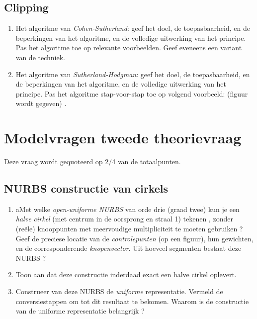 \documentclass{report}
\begin{document}
	\section{Clipping}
	\begin{enumerate}
		\item Het algoritme van \textit{Cohen-Sutherland}: geef het doel, de toepasbaarheid, en de beperkingen van het algoritme, en de volledige uitwerking van het principe. Pas het algoritme toe op relevante voorbeelden. Geef eveneens een variant van de techniek. 
		
		\item Het algoritme van \textit{Sutherland-Hodgman}: geef het doel, de toepasbaarheid, en de beperkingen van het algoritme, en de volledige uitwerking van het principe. Pas het algoritme stap-voor-stap toe op volgend voorbeeld: (figuur wordt gegeven) . 
	\end{enumerate}

	\chapter{Modelvragen tweede theorievraag}
	Deze vraag wordt gequoteerd op 2/4 van de totaalpunten.
	
	\section{NURBS constructie van cirkels }
	\begin{enumerate}
		\item aMet welke \textit{open-uniforme NURBS} van orde drie (graad twee) kun je een \textit{halve cirkel} (met centrum in de oorsprong en straal 1) tekenen , zonder (reële) knooppunten met meervoudige multipliciteit te moeten gebruiken ? Geef de preciese locatie van de \textit{controlepunten} (op een figuur), hun gewichten, en de corresponderende \textit{knopenvector}. Uit hoeveel segmenten bestaat deze NURBS ?
		
		\item Toon aan dat deze constructie inderdaad exact een halve cirkel oplevert.
		
		\item Construeer van deze NURBS de \textit{uniforme} representatie. Vermeld de conversiestappen om tot dit resultaat te bekomen. Waarom is de constructie van de uniforme representatie belangrijk ?
	\end{enumerate}
\end{document}
